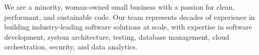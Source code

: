 \documentclass[11pt]{developercv} %
\begin{document}
\begin{minipage}[t]{0.55\textwidth} %
	\vspace{-\baselineskip} %

	We are a minority, woman-owned small business with a passion for clean, performant, and sustainable code. Our team represents decades of experience in building industry-leading software solutions at scale, with expertise in software development, system architecture, testing, database management, cloud orchestration, security, and data analytics.
 
\end{minipage}
\hfill %
\begin{minipage}[t]{0.38\textwidth} %
	\vspace{-\baselineskip} %

\end{minipage}



\end{document}
